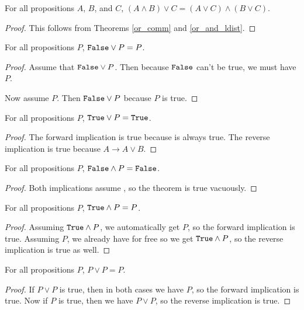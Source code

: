\documentclass[../../math.tex]{subfiles}
\begin{document}
\begin{theorem} \label{or_and_rdist}
    For all propositions $A$, $B$, and $C$, $(A \wedge B) \vee C = (A \vee C)
    \wedge (B \vee C)$.
\end{theorem}
\begin{proof}
    This follows from Theorems \ref{or_comm} and \ref{or_and_ldist}.
\end{proof}

\begin{theorem} \label{or_lfalse}
    For all propositions $P$, $\vtt{False} \vee P = P$.
\end{theorem}
\begin{proof}
    Assume that $\vtt{False} \vee P$.  Then because $\vtt{False}$ can't be true,
    we must have $P$.

    Now assume $P$.  Then $\vtt{False} \vee P$ because $P$ is true.
\end{proof}

\begin{theorem} \label{or_ltrue}
    For all propositions $P$, $\vtt{True} \vee P = \vtt{True}$.
\end{theorem}
\begin{proof}
    The forward implication is true because  is always true.  The
    reverse implication is true because $A \rightarrow A \vee B$.
\end{proof}

\begin{theorem} \label{and_lfalse}
    For all propositions $P$, $\vtt{False} \wedge P = \vtt{False}$.
\end{theorem}
\begin{proof}
    Both implications assume , so the theorem is true vacuously.
\end{proof}

\begin{theorem} \label{and_ltrue}
    For all propositions $P$, $\vtt{True} \wedge P = P$.
\end{theorem}
\begin{proof}
    Assuming $\vtt{True} \wedge P$, we automatically get $P$, so the forward
    implication is true.  Assuming $P$, we already have  for free so
    we get $\vtt{True} \wedge P$, so the reverse implication is true as well.
\end{proof}

\begin{theorem} \label{or_idemp}
    For all propositions $P$, $P \vee P = P$.
\end{theorem}
\begin{proof}
    If $P \vee P$ is true, then in both cases we have $P$, so the forward
    implication is true.  Now if $P$ is true, then we have $P \vee P$, so the
    reverse implication is true.
\end{proof}
\end{document}
